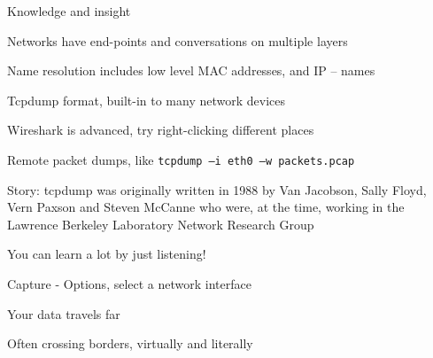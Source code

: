 \documentclass[Screen16to9,17pt]{foils}
\begin{document}




Knowledge and insight
\begin{list2}
\item Networks have end-points and conversations on multiple layers
\item Name resolution includes low level MAC addresses, and IP -- names
\item Tcpdump format, built-in to many network devices
\item Wireshark is advanced, try right-clicking different places
\item Remote packet dumps, like \verb+tcpdump –i eth0 –w packets.pcap+
\item Story: tcpdump was originally written in 1988 by Van Jacobson, Sally Floyd, Vern Paxson and Steven McCanne who were, at the time, working in the Lawrence Berkeley Laboratory Network Research Group\\
\end{list2}

\vskip 5mm

You can learn a lot by just listening!




\centerline{Capture - Options, select a network interface}
\centerline{}




\begin{list2}
\item Your data travels far
\item Often crossing borders, virtually and literally
\end{list2}



\end{document}
